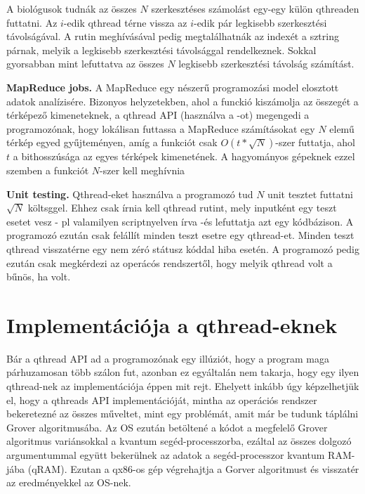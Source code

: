 \indent A biológusok tudnák az összes $N$ szerkesztéses számolást egy-egy külön qthreaden futtatni.
Az $i$-edik qthread térne vissza az $i$-edik pár legkisebb szerkesztési távolságával.
A  rutin meghívásával pedig megtalálhatnák az indexét a sztring párnak, melyik a legkisebb szerkesztési távolsággal rendelkeznek.
Sokkal gyorsabban mint lefuttatva az összes $N$ legkisebb szerkesztési távolság számítást.

\textbf{MapReduce jobs.} A MapReduce egy nészerű programozási model elosztott adatok analízisére.
Bizonyos helyzetekben, ahol a  funckió kiszámolja az összegét a térképező kimeneteknek, a qthread API (használva a -ot) megengedi a programozónak, hogy lokálisan futtassa a MapReduce számításokat egy $N$ elemű térkép egyed gyűjteményen, amíg a  funkciót csak $O(t*\sqrt{N})$-szer futtatja, ahol $t$ a bithosszúsága az egyes térképek kimenetének.
A hagyományos gépeknek ezzel szemben a  funkciót $N$-szer kell meghívnia

\textbf{Unit testing.} Qthread-eket használva a programozó tud $N$ unit tesztet futtatni $\sqrt{N}$ költsggel.
Ehhez csak írnia kell qthread rutint, mely inputként egy teszt esetet vesz - pl valamilyen scriptnyelven írva -és lefuttatja azt egy kódbázison.
A programozó ezután csak felállít minden teszt esetre egy qthread-et.
Minden teszt qthread visszatérne egy nem zéró státusz kóddal hiba esetén.
A programozó pedig ezután csak megkérdezi az operácós rendszertől, hogy melyik qthread volt a bűnös, ha volt.
\section{Implementációja a qthread-eknek}

\indent Bár a qthread API ad a programozónak egy illúziót, hogy a program maga párhuzamosan több szálon fut, azonban ez egyáltalán nem takarja, hogy egy ilyen qthread-nek az implementációja éppen mit rejt.
Ehelyett inkább úgy képzelhetjük el, hogy a qthreads API implementációját, mintha az operációs rendszer bekeretezné az összes  műveltet, mint egy problémát, amit már be tudunk táplálni Grover algoritmusába.
Az OS ezután betöltené a kódot a megfelelő Grover algoritmus variánsokkal a kvantum segéd-processzorba, ezáltal az összes dolgozó argumentummal együtt bekerülnek az adatok a segéd-processzor kvantum RAM-jába (qRAM).
Ezutan a qx86-os gép végrehajtja a Gorver algoritmust és visszatér az eredményekkel az OS-nek.

